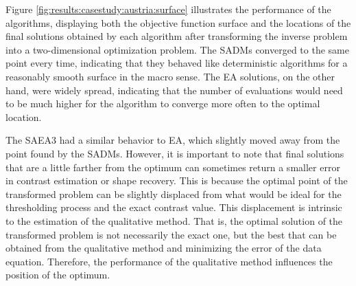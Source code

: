 			
			Figure \ref{fig:results:casestudy:austria:surface} illustrates the performance of the algorithms, displaying both the objective function surface and the locations of the final solutions obtained by each algorithm after transforming the inverse problem into a two-dimensional optimization problem. The SADMs converged to the same point every time, indicating that they behaved like deterministic algorithms for a reasonably smooth surface in the macro sense. The EA solutions, on the other hand, were widely spread, indicating that the number of evaluations would need to be much higher for the algorithm to converge more often to the optimal location.
			
			The SAEA3 had a similar behavior to EA, which slightly moved away from the point found by the SADMs. However, it is important to note that final solutions that are a little farther from the optimum can sometimes return a smaller error in contrast estimation or shape recovery. This is because the optimal point of the transformed problem can be slightly displaced from what would be ideal for the thresholding process and the exact contrast value. This displacement is intrinsic to the estimation of the qualitative method. That is, the optimal solution of the transformed problem is not necessarily the exact one, but the best that can be obtained from the qualitative method and minimizing the error of the data equation. Therefore, the performance of the qualitative method influences the position of the optimum.
		
